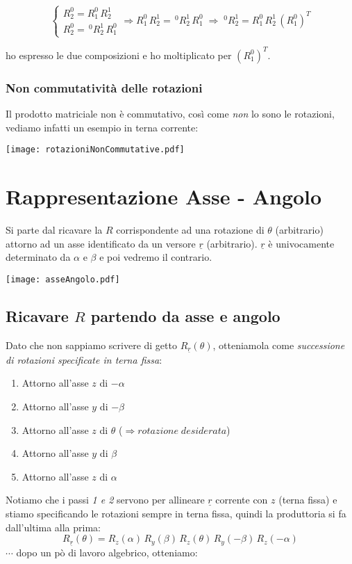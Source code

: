 \begin{equation}
	\begin{cases}
		R_2^0 = R_1^0\,R_2^1 \\
		R_2^0 = \,^0R_2^1\,R_1^0 
	\end{cases}
	\Rightarrow
	R_1^0\,R_2^1 = \,^0R_2^1\,R_1^0 \;
	\Rightarrow \;
	^0R_2^1 = R_1^0\,R_2^1\,(R_1^0)^T
\end{equation}

ho espresso le due composizioni e ho moltiplicato per $(R_1^0)^T$.

\subsubsection{Non commutatività delle rotazioni}
Il prodotto matriciale non è commutativo, così come \emph{non} lo sono le rotazioni, vediamo infatti un esempio in terna corrente:

\texttt{[image: rotazioniNonCommutative.pdf]}
\newpage

\section{Rappresentazione Asse - Angolo}
Si parte dal ricavare la $R$ corrispondente ad una rotazione di $\theta$ (arbitrario) attorno ad un asse identificato da un versore $\underline{r}$ (arbitrario). $\underline{r}$ è univocamente determinato da $\alpha$ e $\beta$ e poi vedremo il contrario.

\texttt{[image: asseAngolo.pdf]}

\subsection{Ricavare $R$ partendo da asse e angolo}
Dato che non sappiamo scrivere di getto $R_{\underline{r}}(\theta)$, otteniamola come \emph{successione di rotazioni specificate in terna fissa}:
\begin{enumerate}
	\item Attorno all'asse $z$ di $- \alpha$
	\item Attorno all'asse $y$ di $- \beta$
	\item Attorno all'asse $z$ di $\theta$ ($\Rightarrow rotazione\;desiderata$)
	\item Attorno all'asse $y$ di $\beta$
	\item Attorno all'asse $z$ di $\alpha$
\end{enumerate}
Notiamo che i passi \emph{1 e 2} servono per allineare $\underline{r}$ corrente con $z$ (terna fissa) e stiamo specificando le rotazioni sempre in terna fissa, quindi la produttoria si fa dall'ultima alla prima:
\begin{equation}
	R_{\underline{r}}(\theta) = R_{z}(\alpha)\,R_{y}(\beta)\,R_{z}(\theta)\,R_{y}(-\beta)\,R_{z}(-\alpha) 
\end{equation}
$\cdots$ dopo un pò di lavoro algebrico, otteniamo:

